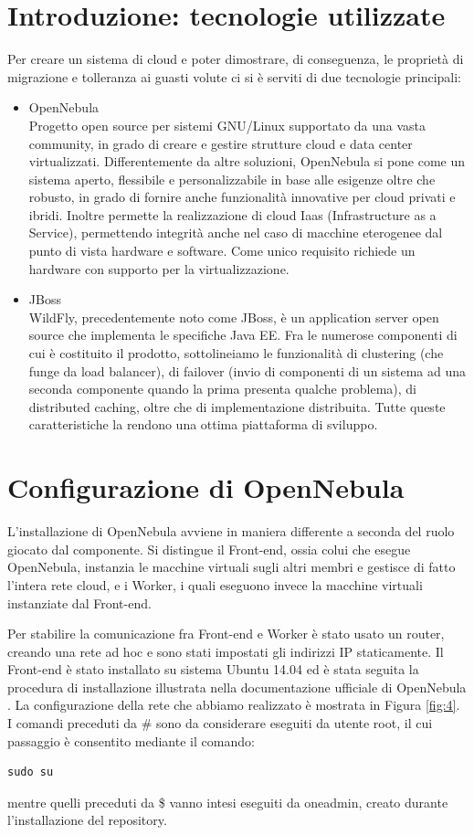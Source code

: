 \documentclass[twoside]{article}
\begin{document}
\section{Introduzione: tecnologie utilizzate}
Per creare un sistema di cloud e poter dimostrare, di conseguenza, le proprietà di migrazione e
tolleranza ai guasti volute ci si è serviti di due tecnologie principali:
\begin{itemize}
	\item OpenNebula \cite{bib:opennebula2} \\
		  Progetto open source per sistemi GNU/Linux supportato da una vasta community, in grado di
		  creare e gestire strutture cloud e data center virtualizzati. Differentemente da altre soluzioni,
		  OpenNebula si pone come un sistema aperto, flessibile e personalizzabile in base alle esigenze
		  oltre che robusto, in grado di fornire anche funzionalità innovative per cloud privati e ibridi.
		  Inoltre permette la realizzazione di cloud Iaas (Infrastructure as a Service), permettendo integrità
		  anche nel caso di macchine eterogenee dal punto di vista hardware e software. Come unico requisito
		  richiede un hardware con supporto per la virtualizzazione.
	\item JBoss \cite{bib:jboss2} \\
		  WildFly, precedentemente noto come JBoss, è un application server open source che implementa
		  le specifiche Java EE. Fra le numerose componenti di cui è costituito il prodotto, sottolineiamo
		  le funzionalità di clustering (che funge da load balancer), di failover (invio di componenti di
		  un sistema ad una seconda componente quando la prima presenta qualche problema), di distributed
		  caching, oltre che di implementazione distribuita. Tutte queste caratteristiche la rendono una
		  ottima piattaforma di sviluppo.
\end{itemize}

\section{Configurazione di OpenNebula}
L'installazione di OpenNebula avviene in maniera differente a seconda del ruolo giocato dal componente.
Si distingue il Front-end, ossia colui che esegue OpenNebula, instanzia le macchine virtuali sugli altri
membri e gestisce di fatto l'intera rete cloud, e i Worker, i quali eseguono invece la macchine virtuali
instanziate dal Front-end.

Per stabilire la comunicazione fra Front-end e Worker è stato usato un router, creando una rete ad hoc 
e sono stati impostati gli indirizzi IP staticamente.
Il Front-end è stato installato su sistema Ubuntu 14.04 ed è stata seguita
la procedura di installazione illustrata nella documentazione ufficiale di OpenNebula \cite{bib:opennebula}.
La configurazione della rete che abbiamo realizzato è mostrata in Figura \ref{fig:4}.
I comandi preceduti da \# sono da considerare eseguiti da utente root, il cui passaggio è consentito
mediante il comando:
\begin{lstlisting}[frame=trBL]
sudo su
\end{lstlisting}
mentre quelli preceduti da \$ vanno intesi eseguiti da oneadmin, creato durante l'installazione del
repository.
\end{document}
